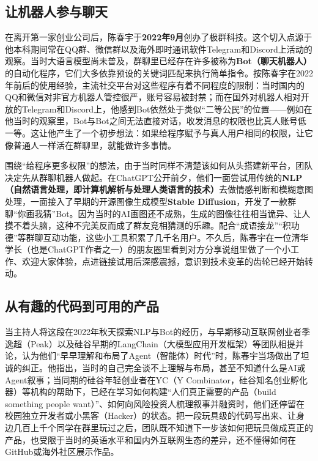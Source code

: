 \documentclass[UTF8,a4paper,11pt,fontset=fandol]{ctexart}
\begin{document}
\subsection{让机器人参与聊天}
在离开第一家创业公司后，陈春宇于\textbf{2022年9月}创办了极群科技。这个切入点源于他本科期间常在QQ群、微信群以及海外即时通讯软件Telegram和Discord上活动的观察。当时大语言模型尚未普及，群聊里已经存在许多被称为\textbf{Bot（聊天机器人）}的自动化程序，它们大多依靠预设的关键词匹配来执行简单指令。按陈春宇在2022年前后的使用经验，主流社交平台对这些程序有着不同程度的限制：当时国内的QQ和微信对非官方机器人管控很严，账号容易被封禁；而在国外对机器人相对开放的Telegram和Discord上，他感到Bot依然处于类似“二等公民”的位置——例如在他当时的观察里，Bot与Bot之间无法直接对话，收发消息的权限也比真人账号低一等。这让他产生了一个初步想法：如果给程序赋予与真人用户相同的权限，让它像普通人一样活在群聊里，就能做许多事情。

围绕“给程序更多权限”的想法，由于当时同样不清楚该如何从头搭建新平台，团队决定先从群聊机器人做起。在ChatGPT公开前夕，他们一面尝试用传统的\textbf{NLP（自然语言处理，即计算机解析与处理人类语言的技术）}去做情感判断和模糊意图处理，一面接入了早期的开源图像生成模型\textbf{Stable Diffusion}，开发了一款群聊“你画我猜”Bot。因为当时的AI画图还不成熟，生成的图像往往相当诡异、让人摸不着头脑，这种不完美反而成了群友竞相猜测的乐趣。配合“成语接龙”“积功德”等群聊互动功能，这些小工具积累了几千名用户。不久后，陈春宇在一位清华学长（也是ChatGPT作者之一）的朋友圈里看到对方分享说组里做了一个小工作、欢迎大家体验，点进链接试用后深感震撼，意识到技术变革的齿轮已经开始转动。

\subsection{从有趣的代码到可用的产品}
当主持人将这段在2022年秋天探索NLP与Bot的经历，与早期移动互联网创业者季逸超（Peak）以及硅谷早期的LangChain（大模型应用开发框架）等团队相提并论，认为他们“早早理解和布局了Agent（智能体）时代”时，陈春宇当场做出了坦诚的纠正。他指出，当时的自己完全谈不上理解与布局，甚至不知道什么是AI或Agent叙事；当同期的硅谷年轻创业者在YC（Y Combinator，硅谷知名创业孵化器）等机构的帮助下，已经在学习如何构建“人们真正需要的产品（build something people want）”、如何向风险投资人梳理叙事并融资时，他们还停留在校园独立开发者或小黑客（Hacker）的状态。把一段玩具级的代码写出来、让身边几百上千个同学在群里玩过之后，团队既不知道下一步该如何把玩具做成真正的产品，也受限于当时的英语水平和国内外互联网生态的差异，还不懂得如何在GitHub或海外社区展示作品。
\end{document}
